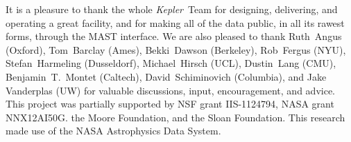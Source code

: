 \documentclass[12pt, preprint]{aastex}
\newcommand{\project}[1]{\textsl{#1}}
\newcommand{\Kepler}{\project{Kepler}}
\begin{document}
\acknowledgements
It is a pleasure to thank the whole \Kepler\ Team
  for designing, delivering, and operating a great facility,
  and for making all of the data public, in all its rawest forms, through the MAST interface.
We are also pleased to thank
  Ruth~Angus (Oxford),
  Tom~Barclay (Ames),
  Bekki~Dawson (Berkeley),
  Rob~Fergus (NYU),
  Stefan~Harmeling (Dusseldorf),
  Michael~Hirsch (UCL),
  Dustin~Lang (CMU),
  Benjamin~T.~Montet (Caltech),
  David~Schiminovich (Columbia),
  and
  Jake Vanderplas (UW)
for valuable discussions, input, encouragement, and advice.
This project was partially supported by
  NSF grant IIS-1124794,
  NASA grant NNX12AI50G.
  the Moore Foundation,
  and
  the Sloan Foundation.
This research made use of the NASA Astrophysics Data System.

\clearpage


\end{document}
